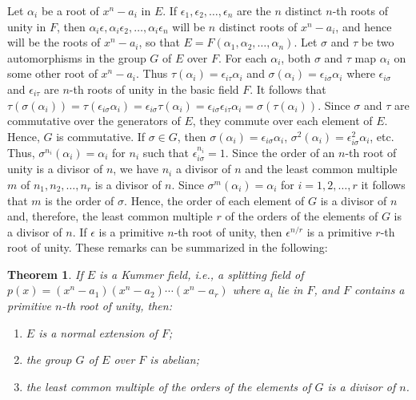 \documentclass[10pt,leqno]{article}
\newtheorem{theo}{Theorem}
\theoremstyle{definition}
\begin{document}
Let $\alpha_i$ be a root of $x^n - a_i$ in $E$.
If $\epsilon_1, \epsilon_2, \ldots, \epsilon_n$ are the $n$ distinct $n$-th roots of unity in $F$, then $\alpha_i \epsilon, \alpha_i \epsilon_2, \ldots, \alpha_i \epsilon_n$ will be $n$ distinct roots of $x^n - a_i$, and hence will be the roots of $x^n - a_i$, so that $E = F(\alpha_1, \alpha_2, \ldots, \alpha_n)$.
Let $\sigma$ and $\tau$ be two automorphisms in the group $G$ of $E$ over $F$.
For each $\alpha_i$, both $\sigma$ and $\tau$ map $\alpha_i$ on some other root of $x^n - a_i$.
Thus $\tau(\alpha_i) = \epsilon_{i\tau} \alpha_i$ and $\sigma(\alpha_i) = \epsilon_{i\sigma} \alpha_i$ where $\epsilon_{i\sigma}$ and $\epsilon_{i\tau}$ are $n$-th roots of unity in the basic field $F$.
It follows that $\tau(\sigma(\alpha_i)) = \tau(\epsilon_{i\sigma} \alpha_i) = \epsilon_{i\sigma} \tau(\alpha_i) = \epsilon_{i\sigma}\epsilon_{i\tau} \alpha_i = \sigma(\tau(\alpha_i))$.
Since $\sigma$ and $\tau$ are commutative over the generators of $E$, they commute over each element of $E$.
Hence, $G$ is commutative.
If $\sigma \in G$, then $\sigma(\alpha_i) = \epsilon_{i\sigma}\alpha_i$, $\sigma^2(\alpha_i) = \epsilon_{i\sigma}^2 \alpha_i$, etc.
Thus, $\sigma^{n_i}(\alpha_i) = \alpha_i$ for $n_i$ such that $\epsilon_{i\sigma}^{n_i} = 1$.
Since the order of an $n$-th root of unity is a divisor of $n$, we have $n_i$ a divisor of $n$ and the least common multiple $m$ of $n_1, n_2, \ldots, n_r$ is a divisor of $n$.
Since $\sigma^m(\alpha_i) = \alpha_i$ for $i = 1,2,\ldots, r$ it follows that $m$ is the order of $\sigma$.
Hence, the order of each element of $G$ is a divisor of $n$ and, therefore, the least common multiple $r$ of the orders of the elements of $G$ is a divisor of $n$.
If $\epsilon$ is a primitive $n$-th root of unity, then $\epsilon^{n/r}$ is a primitive $r$-th root of unity.
These remarks can be summarized in the following:


\begin{theo}
\label{theo:23}
If $E$ is a Kummer field, i.e., a splitting field of $p(x) = (x^n - a_1)(x^n - a_2) \cdots (x^n - a_r)$ where $a_i$ lie in $F$, and $F$ contains a primitive $n$-th root of unity, then:
\begin{enumerate}
\item
\label{theo:23a}
$E$ is a normal extension of $F$;

\item
\label{theo:23b}
the group $G$ of $E$ over $F$ is abelian;

\item
\label{theo:23c}
the least common multiple of the orders of the elements of $G$ is a divisor of $n$.
\end{enumerate}
\end{theo}
\end{document}
